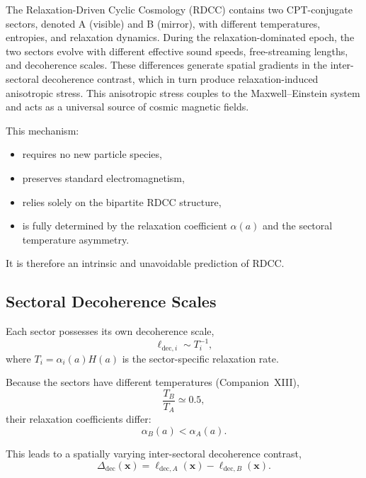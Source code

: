 \documentclass[11pt,a4paper]{article}
\begin{document}
The Relaxation-Driven Cyclic Cosmology (RDCC) contains two CPT-conjugate sectors,
denoted A (visible) and B (mirror), with different temperatures, entropies, and relaxation
dynamics. During the relaxation-dominated epoch, the two sectors evolve with different
effective sound speeds, free-streaming lengths, and decoherence scales. These differences
generate spatial gradients in the inter-sectoral decoherence contrast, which in turn produce
relaxation-induced anisotropic stress. This anisotropic stress couples to the Maxwell–Einstein
system and acts as a universal source of cosmic magnetic fields.

This mechanism:
\begin{itemize}
\item requires no new particle species,
\item preserves standard electromagnetism,
\item relies solely on the bipartite RDCC structure,
\item is fully determined by the relaxation coefficient $\alpha(a)$ and the sectoral
temperature asymmetry.
\end{itemize}

It is therefore an intrinsic and unavoidable prediction of RDCC.

\subsection{Sectoral Decoherence Scales}

Each sector possesses its own decoherence scale,
\begin{equation}
\ell_{\mathrm{dec},i}
\sim
T_{i}^{-1},
\end{equation}
where $T_{i} = \alpha_{i}(a) H(a)$ is the sector-specific relaxation rate.

Because the sectors have different temperatures (Companion~XIII),
\begin{equation}
\frac{T_{B}}{T_{A}} \simeq 0.5,
\end{equation}
their relaxation coefficients differ:
\begin{equation}
\alpha_{B}(a) < \alpha_{A}(a).
\end{equation}

This leads to a spatially varying inter-sectoral decoherence contrast,
\begin{equation}
\Delta_{\mathrm{dec}}(\mathbf{x})
=
\ell_{\mathrm{dec},A}(\mathbf{x})
-
\ell_{\mathrm{dec},B}(\mathbf{x}).
\end{equation}
\end{document}
